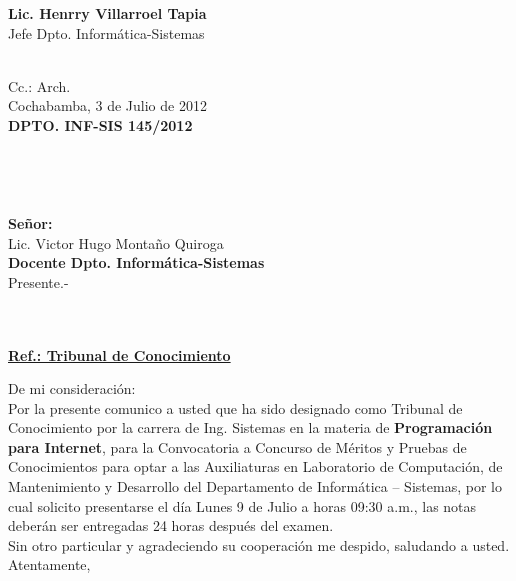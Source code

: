 \documentclass[letterpaper,11pt]{letter}
\begin{document}
\vspace{3.5cm}
\begin{center}
\begin{minipage}[b]{0.5\textwidth}
\begin{center}
{\bf Lic. Henrry Villarroel Tapia}\\
Jefe Dpto. Informática-Sistemas\\
\end{center}
\end{minipage}
\end{center}
~\\
Cc.: Arch.\\
\newpage
Cochabamba, 3 de Julio de 2012~\\
 \textbf{DPTO. INF-SIS 145/2012}\\
~\\
~\\
~\\
~\\
 \textbf{Señor:}~\\
Lic. Victor Hugo Montaño Quiroga~\\
 \textbf{Docente Dpto. Informática-Sistemas}~\\
Presente.-\\
~\\
~\\
\begin{center}
\underline{ \textbf{Ref.: Tribunal de Conocimiento}}
\end{center}
De mi consideración:\\
Por la presente comunico a usted que ha sido designado como Tribunal de Conocimiento por la carrera de Ing. Sistemas en la materia de \textbf{Programación para Internet}, para la Convocatoria a Concurso de Méritos y Pruebas de Conocimientos para optar a las Auxiliaturas en Laboratorio de Computación, de Mantenimiento y Desarrollo del Departamento de Informática – Sistemas, por lo cual solicito presentarse el día Lunes 9 de Julio a horas 09:30 a.m., las notas deberán ser entregadas 24 horas después del examen.\\
Sin otro particular y agradeciendo su cooperación me despido, saludando a usted.\\
Atentamente,\\
\end{document}
